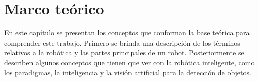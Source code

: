 \chapter{Marco teórico} \label{chap:marco_teorico}
\vspace{5 mm}
En este capítulo se presentan los conceptos que conforman la base teórica para comprender este trabajo. Primero se brinda una descripción de los términos relativos a la robótica y las partes principales de un robot. Posteriormente se describen algunos conceptos que tienen que ver con la robótica inteligente, como los paradigmas, la inteligencia y la visión artificial para la detección de objetos. 
